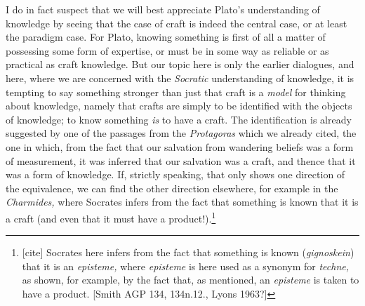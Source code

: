 \documentclass[11pt]{amsart}
\begin{document}
I do in fact suspect that we will best appreciate Plato's understanding of knowledge by seeing that the case of craft is indeed the central case, or at least the paradigm case. For Plato, knowing something is first of all a matter of possessing some form of expertise, or must be in some way as reliable or as practical as craft knowledge. But our topic here is only the earlier dialogues, and here, where we are concerned with the \emph{Socratic} understanding of knowledge, it is tempting to say something stronger than just that craft is a \emph{model} for thinking about knowledge, namely that crafts are simply to be identified with the objects of knowledge; to know something \emph{is} to have a craft. The identification is already suggested by one of the passages from the \emph{Protagoras} which we already cited, the one in which, from the fact that our salvation from wandering beliefs was a form of measurement, it was inferred that our salvation was a craft, and thence that it was a form of knowledge. If, strictly speaking, that only shows one direction of the equivalence, we can find the other direction elsewhere, for example in the \emph{Charmides,} where Socrates infers from the fact that something is known that it is a craft (and even that it must have a product!).\footnote{[cite] Socrates here infers from the fact that something is known (\emph{gignoskein}) that it is an \emph{episteme,} where \emph{episteme} is here used as a synonym for \emph{techne,} as shown, for example, by the fact that, as mentioned, an \emph{episteme} is taken to have a product. [Smith AGP 134, 134n.12., Lyons 1963?]}\\
\end{document}
